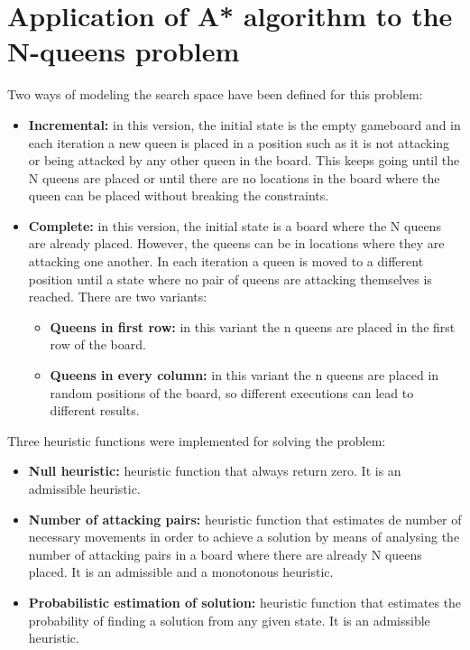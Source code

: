\documentclass[11pt]{llncs}
\begin{document}
\section{Application of A* algorithm to the N-queens problem}\label{astar_nqueens}
Two ways of modeling the search space have been defined for this problem:
\begin{itemize}
    \item \textbf{Incremental:} in this version, the initial state is the empty gameboard and in each iteration a new queen is placed in a position such as it is not attacking or being attacked by any other queen in the board. This keeps going until the N queens are placed or until there are no locations in the board where the queen can be placed without breaking the constraints.
    \item \textbf{Complete:} in this version, the initial state is a board where the N queens are already placed. However, the queens can be in locations where they are attacking one another. In each iteration a queen is moved to a different position until a state where no pair of queens are attacking themselves is reached. There are two variants:
    \begin{itemize}
        \item \textbf{Queens in first row:} in this variant the n queens are placed in the first row of the board.
        \item \textbf{Queens in every column:} in this variant the n queens are placed in random positions of the board, so different executions can lead to different results.
    \end{itemize}
\end{itemize}
Three heuristic functions were implemented for solving the problem:
\begin{itemize}
    \item \textbf{Null heuristic:} heuristic function that always return zero. It is an admissible heuristic.  
    \item \textbf{Number of attacking pairs:} heuristic function that estimates de number of necessary movements in order to achieve a solution by means of analysing the number of attacking pairs in a board where there are already N queens placed. It is an admissible and a monotonous heuristic.
    \item \textbf{Probabilistic estimation of solution:} heuristic function that estimates the probability of finding a solution from any given state. It is an admissible heuristic. 
\end{itemize}
\end{document}
